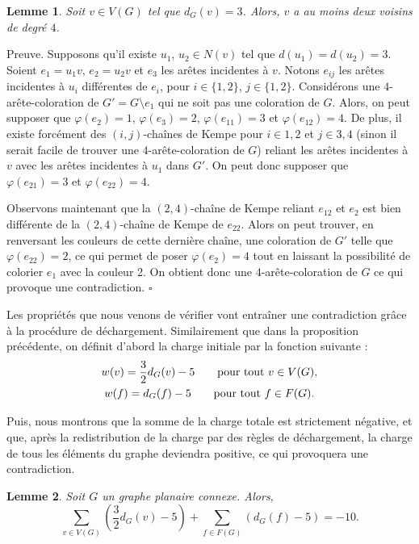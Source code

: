 \documentclass[10pt,a4paper]{article}
\newtheorem{lemme}{Lemme}
\newcommand{\ep}{{\hfill $\square$}}
\begin{document}
\begin{lemme}
Soit $v \in V(G)$ tel que $d_G(v)=3$. Alors, $v$ a au moins deux voisins de degré $4$.
\label{le:333}
\end{lemme}

Preuve.
Supposons qu'il existe $u_1$, $u_2 \in N(v)$ tel que $d(u_1) = d(u_2) = 3$. Soient $e_1 = u_1v$, $e_2 = u_2v$ et $e_3$ les arêtes incidentes à $v$. Notons $e_{ij}$ les arêtes incidentes à $u_i$ différentes de $e_i$, pour $i \in \{1,2\}$, $j \in \{1,2\}$. Considérons une $4$-arête-coloration de $G' = G \setminus e_1$ qui ne soit pas une coloration de $G$. Alors, on peut supposer que  $\varphi(e_2)=1$, $\varphi(e_3)=2$, $\varphi(e_{11})=3$ et $\varphi(e_{12})=4$. De plus, il existe forcément des $(i,j)$-chaînes de Kempe pour $i \in {1,2}$ et $j \in {3,4}$ (sinon il serait facile de trouver une $4$-arête-coloration de $G$) reliant les arêtes incidentes à $v$ avec les arêtes incidentes à $u_1$ dans $G'$. On peut donc supposer que $\varphi(e_{21})=3$ et $\varphi(e_{22})=4$.

Observons maintenant que la $(2,4)$-chaîne de Kempe reliant $e_{12}$ et $e_2$ est bien différente de la $(2,4)$-chaîne de Kempe de $e_{22}$. Alors on peut trouver, en renversant les couleurs de cette dernière chaîne, une coloration de $G'$ telle que $\varphi(e_{22}) = 2$, ce qui permet de poser $\varphi(e_2) = 4$ tout en laissant la possibilité de colorier $e_1$ avec la couleur 2. On obtient donc une $4$-arête-coloration de $G$ ce qui provoque une contradiction.
\ep


Les propriétés que nous venons de vérifier vont entraîner une contradiction grâce à la procédure de déchargement. Similairement que dans la proposition précédente, on définit d'abord la charge initiale par la fonction suivante :
$$
\gathered
w(v) = \frac{3}{2} d_G(v) - 5 \qquad \textrm{pour tout $v\in V(G)$,} \\
w(f) = d_G(f) - 5 \qquad \textrm{pour tout $f\in F(G)$.}
\endgathered
$$

Puis, nous montrons que la somme de la charge totale est strictement négative, et que, après la redistribution de la charge par des règles de déchargement, la charge de tous les éléments du graphe deviendra positive, ce qui provoquera une contradiction.


\begin{lemme}
Soit $G$ un graphe planaire connexe. Alors,
$$
\sum_{v \in V(G)} \left(\frac{3}{2} d_G(v) - 5\right) + \sum_{f\in F(G)} \left(d_G(f) -5\right) = -10.
$$
\label{le:cha2}
\end{lemme}
\end{document}

